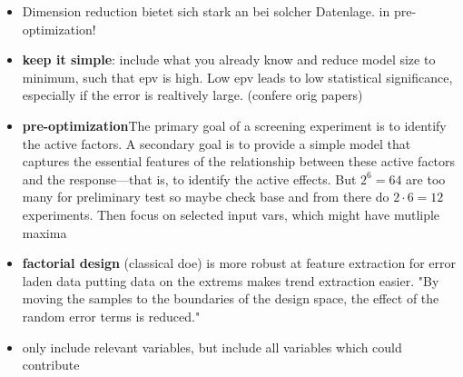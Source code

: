 \begin{itemize}
    \item Dimension reduction bietet sich stark an bei solcher Datenlage. in pre-optimization!
    \item \textbf{keep it simple}: include what you already know and reduce model size to minimum, such that \gls{epv} is high.  Low \gls{epv} leads to low statistical significance, especially if the error is realtively large. (confere orig papers)
    \item \textbf{pre-optimization}{The primary goal of a screening experiment is to identify the active factors. A secondary goal is to provide a simple model that captures the essential features of the relationship between these active factors and the response—that is, to identify the active effects. \cite{miller2001using}} But $2^6=64$ are too many for preliminary test so maybe check base and from there do $2\cdot6=12$ experiments. Then focus on selected input vars, which might have mutliple maxima \\ 
    \item \textbf{factorial design} (classical \gls{doe}) is more robust at feature extraction for error laden data\cite{giunta2003overview} putting data on the extrems makes trend extraction easier. "By moving the samples to the boundaries of the design space, the effect of the random error terms is reduced."
    \item only include relevant variables\cite{gunst2009fractional}, but include all variables which could contribute\cite{haertler2014statistisch}

\end{itemize}
